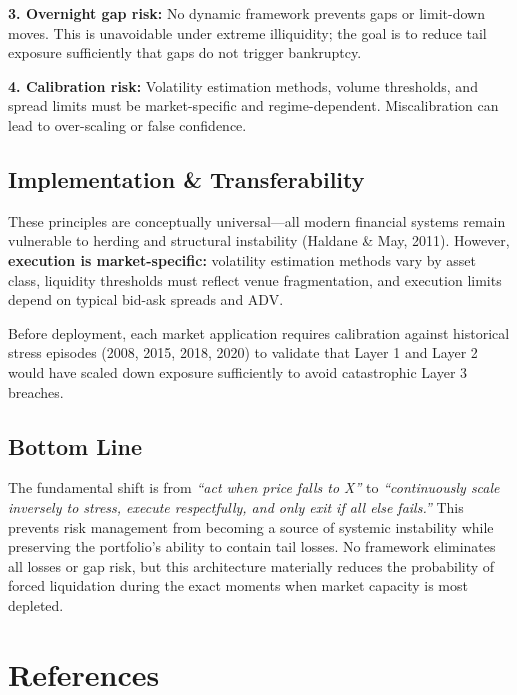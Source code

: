 \documentclass[12pt, a4paper]{article}
\begin{document}
\noindent\textbf{3. Overnight gap risk:} No dynamic framework prevents gaps or limit-down moves. This is unavoidable
under extreme illiquidity; the goal is to reduce tail exposure sufficiently that gaps do not trigger bankruptcy.

\noindent\textbf{4. Calibration risk:} Volatility estimation methods, volume thresholds, and spread limits must be
market-specific and regime-dependent. Miscalibration can lead to over-scaling or false confidence.

\subsection*{Implementation \& Transferability}

These principles are conceptually universal---all modern financial systems remain vulnerable to herding and structural
instability (Haldane \& May, 2011). However, \textbf{execution is market-specific:} volatility estimation methods vary
by asset class, liquidity thresholds must reflect venue fragmentation, and execution limits depend on typical bid-ask
spreads and ADV.

Before deployment, each market application requires calibration against historical stress episodes (2008, 2015, 2018, 2020)
to validate that Layer 1 and Layer 2 would have scaled down exposure sufficiently to avoid catastrophic Layer 3 breaches.

\subsection*{Bottom Line}

The fundamental shift is from \textit{``act when price falls to X''} to \textit{``continuously scale inversely to stress,
execute respectfully, and only exit if all else fails.''} This prevents risk management from becoming a source of systemic
instability while preserving the portfolio's ability to contain tail losses. No framework eliminates all losses or gap risk,
but this architecture materially reduces the probability of forced liquidation during the exact moments when market capacity
is most depleted.

\newpage
\section*{References}
\end{document}
